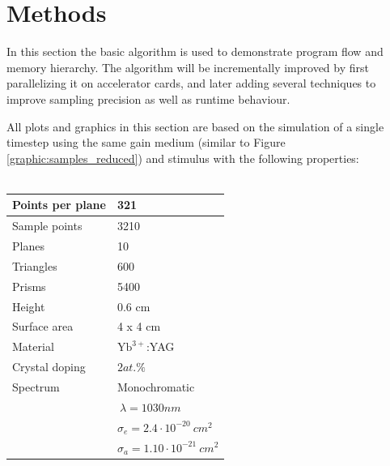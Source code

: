 \section{Methods}

In this section the basic algorithm is used to demonstrate
program flow and memory hierarchy. The algorithm will be incrementally improved
by first parallelizing it on accelerator cards, and later adding several
techniques to improve sampling precision as well as runtime behaviour.

All plots and graphics in this section
are based on the simulation of a single timestep using the same gain medium (similar to Figure
\ref{graphic:samples_reduced}) and stimulus
with the following properties:
\\
\\
\begin{tabular}{| l | l |}
\hline
Points per plane        & 321\\
\hline
Sample points           & 3210\\
\hline
Planes                  & 10\\
\hline
Triangles               & 600\\
\hline
Prisms                  & 5400\\
\hline
Height                  & 0.6 cm\\
\hline
Surface area            & 4 x 4 cm\\
\hline
Material                & $\text{Yb}^{3+}$:YAG\\
\hline
Crystal doping          & $2at.\%$\\
\hline
Spectrum                & Monochromatic\\
                        & $~\lambda = 1030nm$\\
                        & $\sigma_e = 2.4 \cdot 10^{-20}~cm^2$\\ 
                        & $\sigma_a = 1.10 \cdot 10^{-21}~cm^2$\\
\hline
\end{tabular}

